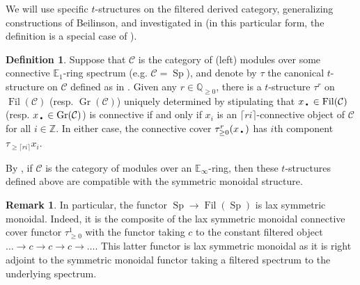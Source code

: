 \documentclass[11pt,leqno]{article}
\newcommand{\zz}{\mathbb{Z}}
\newcommand{\bb}[1]{\mathbb{#1}}
\newcommand{\mc}[1]{\mathcal{#1}}
\newcommand{\mo}[1]{\operatorname{#1}}
\newcommand{\bdot}{\text{\textbullet}}
\newtheorem*{short hand}{theorem name}
\theoremstyle{plain}  %
\theoremstyle{definition}
\newtheorem{definition}{Definition}[section]
\newtheorem{remark}{Remark}[section]
\numberwithin{equation}{section}
\begin{document}
We will use specific $t$-structures on the filtered derived category, generalizing constructions of Beilinson, and investigated in \cite{burklund2022galois} (in this particular form, the definition is a special case of \cite[~Definition 2.4]{lee2023topological}).  
\begin{definition}\label{definition2.1}
	Suppose that $\mc{C}$ is the category of (left) modules over some connective $\bb{E}_1$-ring spectrum (e.g. $\mc{C}=\mo{Sp}$), and denote by $\tau$ the canonical $t$-structure on $\mc{C}$ defined as in \cite[~Proposition 7.1.1.13]{HA}.  Given any $r\in\bb{Q}_{\geq 0}$, there is a $t$-structure $\tau^r$ on $\mo{Fil}(\mc{C})$ (resp. $\mo{Gr}(\mc{C})$) uniquely determined by stipulating that $x_{\bdot}\in\mo{Fil}(\mc{C})$ (resp. $x_{\bdot}\in\mo{Gr}(\mc{C})$) is connective if and only if $x_i$ is an $\lceil ri\rceil$-connective object of $\mc{C}$ for all $i\in\zz$.  In either case, the connective cover $\tau^{r}_{\geq 0}(x_{\bdot})$ has $i$th component $\tau_{\geq \lceil ri\rceil }x_i$.
\end{definition}
By \cite[~Lemma 2.6]{lee2023topological}, if $\mc{C}$ is the category of modules over an $\bb{E}_{\infty}$-ring, then these $t$-structures defined above are compatible with the symmetric monoidal structure.  
\begin{remark}\label{rem2.2}
In particular, the functor $\mo{Sp}\to\mo{Fil}(\mo{Sp})$ is lax symmetric monoidal.  Indeed, it is the composite of the lax symmetric monoidal connective cover functor $\tau_{\geq 0}^{1}$ with the functor taking $c$ to the constant filtered object $\ldots \to c\to c\to c\to\ldots$.  This latter functor is lax symmetric monoidal as it is right adjoint to the symmetric monoidal functor taking a filtered spectrum to the underlying spectrum.
\end{remark}
\end{document}
